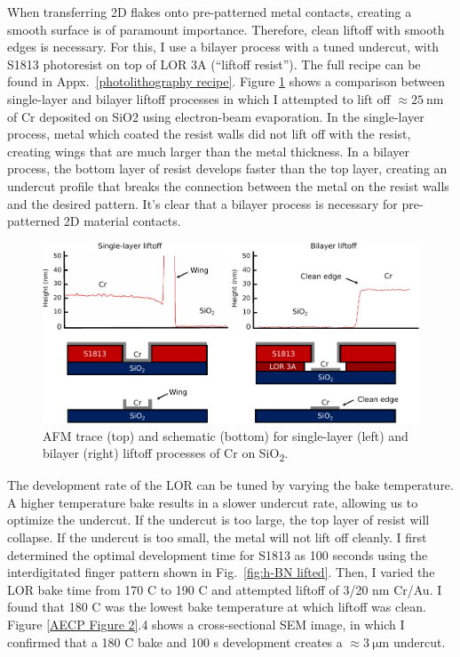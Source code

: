\documentclass[double,12pt,1in,seploa]{beavtex}
\begin{document}
When transferring 2D flakes onto pre-patterned metal contacts, creating a smooth surface is of paramount importance. Therefore, clean liftoff with smooth edges is necessary. For this, I use a bilayer process with a tuned undercut, with S1813 photoresist on top of LOR 3A (“liftoff resist”). The full recipe can be found in Appx.\ \ref{photolithography recipe}. Figure \ref{fig:Liftoff AFM} shows a comparison between single-layer and bilayer liftoff processes in which I attempted to lift off $\approx \SI{25}{\nano\meter}$ of Cr deposited on SiO2 using electron-beam evaporation. In the single-layer process, metal which coated the resist walls did not lift off with the resist, creating wings that are much larger than the metal thickness. In a bilayer process, the bottom layer of resist develops faster than the top layer, creating an undercut profile that breaks the connection between the metal on the resist walls and the desired pattern. It’s clear that a bilayer process is necessary for pre-patterned 2D material contacts. 



\begin{figure}
    \includegraphics[width = 1\textwidth]{liftoff AFM traces comparison.pdf}
    \caption{AFM trace (top) and schematic (bottom) for single-layer (left) and bilayer (right) liftoff processes of Cr on SiO\textsubscript{2}.}
    \label{fig:Liftoff AFM}
\end{figure}

The development rate of the LOR can be tuned by varying the bake temperature. A higher temperature bake results in a slower undercut rate, allowing us to optimize the undercut. If the undercut is too large, the top layer of resist will collapse. If the undercut is too small, the metal will not lift off cleanly. I first determined the optimal development time for S1813 as 100 seconds using the interdigitated finger pattern shown in Fig.\ \ref{fig:h-BN lifted}. Then, I varied the LOR bake time from 170 C to 190 C and attempted liftoff of 3/20 nm Cr/Au. I found that 180 C was the lowest bake temperature at which liftoff was clean. Figure \ref{AECP Figure 2}.4 shows a cross-sectional SEM image, in which I confirmed that a 180 C bake and 100 s development creates a $\approx \SI{3}{\micro\meter}$ undercut.
\end{document}
